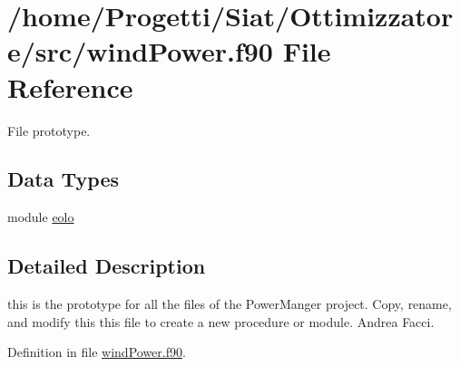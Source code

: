 \hypertarget{wind_power_8f90}{\section{/home/\-Progetti/\-Siat/\-Ottimizzatore/src/wind\-Power.f90 File Reference}
\label{wind_power_8f90}
}


File prototype.  


\subsection*{Data Types}
\begin{DoxyCompactItemize}
\item 
module \hyperlink{classeolo}{eolo}
\end{DoxyCompactItemize}


\subsection{Detailed Description}
this is the prototype for all the files of the Power\-Manger project. Copy, rename, and modify this this file to create a new procedure or module.  Andrea Facci. 

Definition in file \hyperlink{wind_power_8f90_source}{wind\-Power.\-f90}.

